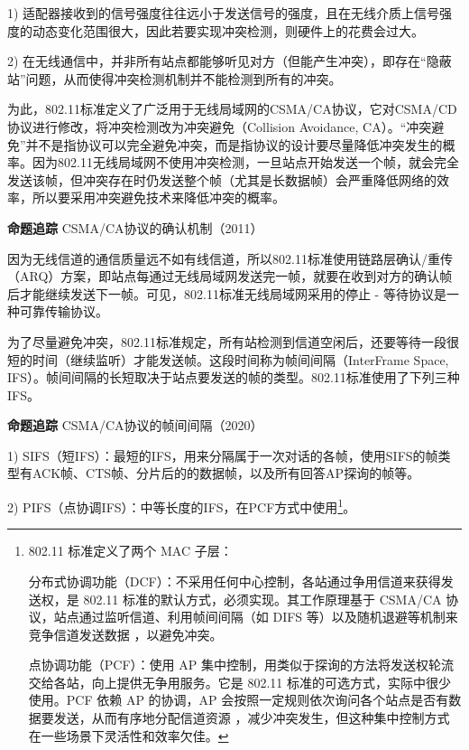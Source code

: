 \documentclass{ctexbook}
\begin{document}
	1) 适配器接收到的信号强度往往远小于发送信号的强度，且在无线介质上信号强度的动态变化范围很大，因此若要实现冲突检测，则硬件上的花费会过大。
	
	2) 在无线通信中，并非所有站点都能够听见对方（但能产生冲突），即存在“隐蔽站”问题，从而使得冲突检测机制并不能检测到所有的冲突。
	
	为此，802.11标准定义了广泛用于无线局域网的CSMA/CA协议，它对CSMA/CD协议进行修改，将冲突检测改为冲突避免（Collision Avoidance, CA）。“冲突避免”并不是指协议可以完全避免冲突，而是指协议的设计要尽量降低冲突发生的概率。因为802.11无线局域网不使用冲突检测，一旦站点开始发送一个帧，就会完全发送该帧，但冲突存在时仍发送整个帧（尤其是长数据帧）会严重降低网络的效率，所以要采用冲突避免技术来降低冲突的概率。
	
	\begin{tcolorbox}[colframe=black, colback=white]
		\kaishu \textbf{命题追踪} \quad CSMA/CA协议的确认机制（2011）
	\end{tcolorbox}
	
	因为无线信道的通信质量远不如有线信道，所以802.11标准使用链路层确认/重传（ARQ）方案，即站点每通过无线局域网发送完一帧，就要在收到对方的确认帧后才能继续发送下一帧。可见，802.11标准无线局域网采用的停止 - 等待协议是一种可靠传输协议。
	
	为了尽量避免冲突，802.11标准规定，所有站检测到信道空闲后，还要等待一段很短的时间（继续监听）才能发送帧。这段时间称为帧间间隔（InterFrame Space, IFS）。帧间间隔的长短取决于站点要发送的帧的类型。802.11标准使用了下列三种IFS。
	
	\begin{tcolorbox}[colframe=black, colback=white]
		\kaishu \textbf{命题追踪} \quad CSMA/CA协议的帧间间隔（2020）
	\end{tcolorbox}
	
	1) SIFS（短IFS）：最短的IFS，用来分隔属于一次对话的各帧，使用SIFS的帧类型有ACK帧、CTS帧、分片后的的数据帧，以及所有回答AP探询的帧等。
	
	2) PIFS（点协调IFS）：中等长度的IFS，在PCF方式中使用\footnote{802.11 标准定义了两个 MAC 子层：
		
		分布式协调功能（DCF）：不采用任何中心控制，各站通过争用信道来获得发送权，是 802.11 标准的默认方式，必须实现。其工作原理基于 CSMA/CA 协议，站点通过监听信道、利用帧间间隔（如 DIFS 等）以及随机退避等机制来竞争信道发送数据 ，以避免冲突。
		
		点协调功能（PCF）：使用 AP 集中控制，用类似于探询的方法将发送权轮流交给各站，向上提供无争用服务。它是 802.11 标准的可选方式，实际中很少使用。PCF 依赖 AP 的协调，AP 会按照一定规则依次询问各个站点是否有数据要发送，从而有序地分配信道资源 ，减少冲突发生，但这种集中控制方式在一些场景下灵活性和效率欠佳。}。
	
\end{document}

